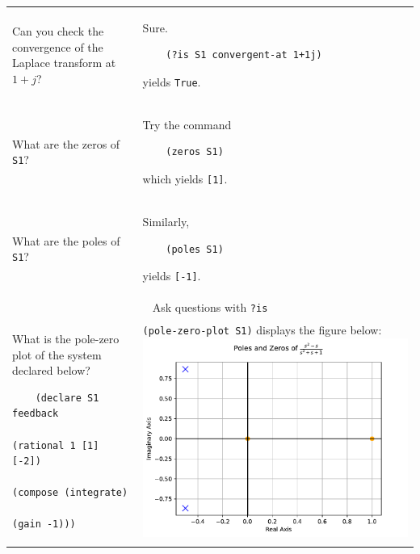 \documentclass[11pt,letter]{article}
\begin{document}
\begin{longtable}{ p{} p{} }
  Can you check the convergence of the Laplace transform at $1+j$?
  &
  Sure.
  \begin{lstlisting}
    (?is S1 convergent-at 1+1j)
  \end{lstlisting}
  yields \lstinline!True!. \\

  What are the zeros of \lstinline!S1!?
  &
  Try the command
  \begin{lstlisting}
    (zeros S1)
  \end{lstlisting}
  which yields \lstinline![1]!. \\

  What are the poles of \lstinline!S1!?
  &
  Similarly,
  \begin{lstlisting}
    (poles S1)
  \end{lstlisting}
  yields \lstinline![-1]!. \\

  \midrule

  \multicolumn{2}{c}{\Large Ask questions with \lstinline!?is!} \\

  \midrule

  What is the pole-zero plot of the system declared below?
  \begin{lstlisting}
    (declare S1 feedback
                (rational 1 [1] [-2])
                (compose (integrate)
                         (gain -1)))
  \end{lstlisting}
  &
  \lstinline!(pole-zero-plot S1)! displays the figure below:
  \includegraphics[width=\linewidth]{figs/pz-feedback} \\


\end{longtable}
\end{document}
